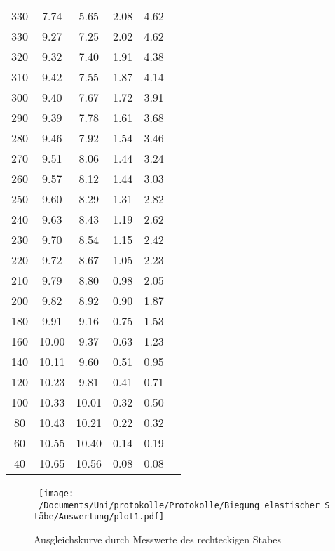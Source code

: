 \begin{table}
\begin{tabular}{c c c c c c}
    330 & 7.74 & 5.65 & 2.08 & 4.62 \\
    330 & 9.27 & 7.25 & 2.02 & 4.62 \\
    320 & 9.32 & 7.40 & 1.91 & 4.38 \\
    310 & 9.42 & 7.55 & 1.87 & 4.14 \\
    300 & 9.40 & 7.67 & 1.72 & 3.91 \\
    290 & 9.39 & 7.78 & 1.61 & 3.68 \\
    280 & 9.46 & 7.92 & 1.54 & 3.46 \\
    270 & 9.51 & 8.06 & 1.44 & 3.24 \\
    260 & 9.57 & 8.12 & 1.44 & 3.03 \\
    250 & 9.60 & 8.29 & 1.31 & 2.82 \\
    240 & 9.63 & 8.43 & 1.19 & 2.62 \\
    230 & 9.70 & 8.54 & 1.15 & 2.42 \\
    220 & 9.72 & 8.67 & 1.05 & 2.23 \\
    210 & 9.79 & 8.80 & 0.98 & 2.05 \\
    200 & 9.82 & 8.92 & 0.90 & 1.87 \\
    180 & 9.91 & 9.16 & 0.75 & 1.53 \\
    160 & 10.00 & 9.37 & 0.63 & 1.23 \\
    140 & 10.11 & 9.60 & 0.51 & 0.95 \\
    120 & 10.23 & 9.81 & 0.41 & 0.71 \\
    100 & 10.33 & 10.01 & 0.32 & 0.50 \\
    80 & 10.43 & 10.21 & 0.22 & 0.32 \\
    60 & 10.55 & 10.40 & 0.14 & 0.19 \\
    40 & 10.65 & 10.56 & 0.08 & 0.08 \\
    \bottomrule
  \end{tabular}
\end{table}

\begin{figure}
  \centering\
  \texttt{[image: ~/Documents/Uni/protokolle/Protokolle/Biegung\_elastischer\_Stäbe/Auswertung/plot1.pdf]}
  \caption{Ausgleichskurve durch Messwerte des rechteckigen Stabes}
  \label{fig:kurveRecht}
\end{figure}

